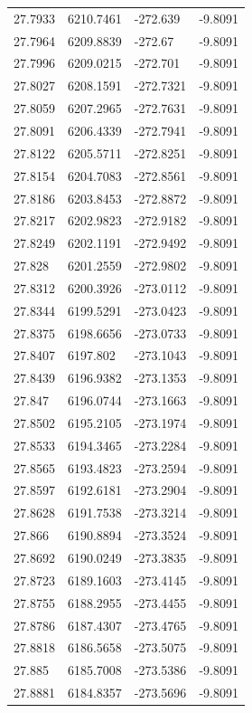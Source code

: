 \begin{table}[H]
\begin{tabular}{llll}
27.7933 & 6210.7461 & -272.639 & -9.8091 \\
27.7964 & 6209.8839 & -272.67 & -9.8091 \\
27.7996 & 6209.0215 & -272.701 & -9.8091 \\
27.8027 & 6208.1591 & -272.7321 & -9.8091 \\
27.8059 & 6207.2965 & -272.7631 & -9.8091 \\
27.8091 & 6206.4339 & -272.7941 & -9.8091 \\
27.8122 & 6205.5711 & -272.8251 & -9.8091 \\
27.8154 & 6204.7083 & -272.8561 & -9.8091 \\
27.8186 & 6203.8453 & -272.8872 & -9.8091 \\
27.8217 & 6202.9823 & -272.9182 & -9.8091 \\
27.8249 & 6202.1191 & -272.9492 & -9.8091 \\
27.828 & 6201.2559 & -272.9802 & -9.8091 \\
27.8312 & 6200.3926 & -273.0112 & -9.8091 \\
27.8344 & 6199.5291 & -273.0423 & -9.8091 \\
27.8375 & 6198.6656 & -273.0733 & -9.8091 \\
27.8407 & 6197.802 & -273.1043 & -9.8091 \\
27.8439 & 6196.9382 & -273.1353 & -9.8091 \\
27.847 & 6196.0744 & -273.1663 & -9.8091 \\
27.8502 & 6195.2105 & -273.1974 & -9.8091 \\
27.8533 & 6194.3465 & -273.2284 & -9.8091 \\
27.8565 & 6193.4823 & -273.2594 & -9.8091 \\
27.8597 & 6192.6181 & -273.2904 & -9.8091 \\
27.8628 & 6191.7538 & -273.3214 & -9.8091 \\
27.866 & 6190.8894 & -273.3524 & -9.8091 \\
27.8692 & 6190.0249 & -273.3835 & -9.8091 \\
27.8723 & 6189.1603 & -273.4145 & -9.8091 \\
27.8755 & 6188.2955 & -273.4455 & -9.8091 \\
27.8786 & 6187.4307 & -273.4765 & -9.8091 \\
27.8818 & 6186.5658 & -273.5075 & -9.8091 \\
27.885 & 6185.7008 & -273.5386 & -9.8091 \\
27.8881 & 6184.8357 & -273.5696 & -9.8091 \\

\end{tabular}
\end{table}
